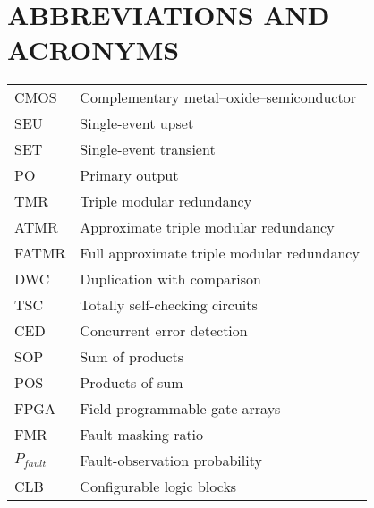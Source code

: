 \newpage
\renewcommand*\contentsname{CONTENTS}
\tableofcontents


\newpage
\section*{ABBREVIATIONS AND ACRONYMS}

\begin{table}[h!]
    \captionsetup{labelformat=empty}
    \begin{tabular}{ll} %
      CMOS				&			Complementary metal–oxide–semiconductor \\
	  SEU			    &		    Single-event upset\\
	  SET		    	&			Single-event transient\\
	  PO			    &			Primary output \\			
      TMR				&			Triple modular redundancy\\
      ATMR              &           Approximate triple modular redundancy\\
      FATMR             &           Full approximate triple modular redundancy\\
      DWC 				& 			Duplication with comparison\\
      TSC		 		& 			Totally self-checking circuits\\
      CED		 		& 			Concurrent error detection\\
      SOP               &           Sum of products\\
      POS               &           Products of sum\\
      FPGA              &           Field-programmable gate arrays\\
      FMR               &           Fault masking ratio\\
      $P_{fault}$       &           Fault-observation probability\\
      CLB               &           Configurable logic blocks\\

\end{tabular}
\end{table}
